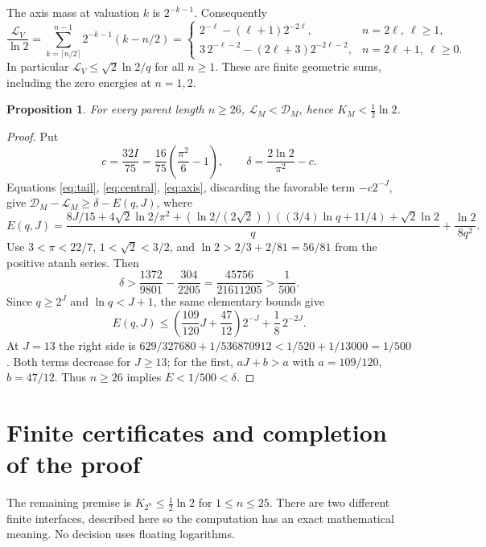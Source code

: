 \documentclass[11pt,a4paper]{article}
\numberwithin{equation}{section}
\newtheorem{proposition}[theorem]{Proposition}
\theoremstyle{remark}
\begin{document}
The axis mass at valuation $k$ is $2^{-k-1}$. Consequently
\begin{equation}\label{eq:axis}
 \frac{\mathcal L_V}{\ln2}
 =\sum_{k=\lceil n/2\rceil}^{n-1}2^{-k-1}(k-n/2)
 =
 \begin{cases}
 2^{-\ell}-(\ell+1)2^{-2\ell},&n=2\ell,\ \ell\ge1,\\
 3\,2^{-\ell-2}-(2\ell+3)2^{-2\ell-2},&n=2\ell+1,\ \ell\ge0.
 \end{cases}
\end{equation}
In particular $\mathcal L_V\le\sqrt2\ln2/q$ for all $n\ge1$.
These are finite geometric sums, including the zero energies at $n=1,2$.

\begin{proposition}\label{prop:cutoff}
For every parent length $n\ge26$,
$\mathcal L_M<\mathcal D_M$, hence $K_M<\frac12\ln2$.
\end{proposition}
\begin{proof}
Put
\[
 c=\frac{32I}{75}=\frac{16}{75}\left(\frac{\pi^2}{6}-1\right),
 \qquad \delta=\frac{2\ln2}{\pi^2}-c.
\]
Equations \eqref{eq:tail}, \eqref{eq:central}, \eqref{eq:axis}, discarding
the favorable term $-c2^{-J}$, give
$\mathcal D_M-\mathcal L_M\ge\delta-E(q,J)$, where
\[
 E(q,J)=\frac{8J/15+4\sqrt2\ln2/\pi^2+
       (\ln2/(2\sqrt2))((3/4)\ln q+11/4)+\sqrt2\ln2}{q}
                   +\frac{\ln2}{8q^2}.
\]
Use $3<\pi<22/7$, $1<\sqrt2<3/2$, and
$\ln2>2/3+2/81=56/81$ from the positive atanh series. Then
\[
 \delta>\frac{1372}{9801}-\frac{304}{2205}
        =\frac{45756}{21611205}>\frac1{500}.
\]
Since $q\ge2^J$ and $\ln q<J+1$, the same elementary bounds give
\[
 E(q,J)\le
 \left(\frac{109}{120}J+\frac{47}{12}\right)2^{-J}
                   +\frac18\,2^{-2J}.
\]
At $J=13$ the right side is
$629/327680+1/536870912<1/520+1/13000=1/500$.
Both terms decrease for $J\ge13$; for the first,
$aJ+b>a$ with $a=109/120$, $b=47/12$.
Thus $n\ge26$ implies $E<1/500<\delta$.
\end{proof}

\section{Finite certificates and completion of the proof}\label{sec:finite}
The remaining premise is $K_{2^n}\le\frac12\ln2$ for $1\le n\le25$.
There are two different finite interfaces, described here so the computation
has an exact mathematical meaning. No decision uses floating logarithms.
\end{document}
